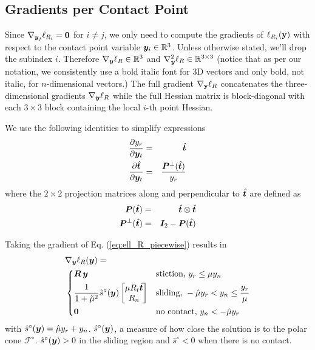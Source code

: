 \subsection{Gradients per Contact Point}
Since $\nabla_{{\bm{y}}_j}\ell_{R_i}={\bm{0}}$ for $i\neq j$, we only need to
compute the gradients of $\ell_{R_i}({\mathbf{y}})$ with respect to the contact point
variable ${\bm{y}}_i\in\mathbb{R}^3$. Unless otherwise stated, we'll drop the
subindex $i$. Therefore $\nabla_{\bm{y}}\ell_R\in\mathbb{R}^3$ and
$\nabla_{\bm{y}}^2\ell_R\in\mathbb{R}^{3\times 3}$ (notice that as per our
notation, we consistently use a bold italic font for 3D vectors and only bold,
not italic, for $n\text{-dimensional}$ vectors.) The full gradient
$\nabla_{\mathbf{y}}\ell_R$ concatenates the three-dimensional gradients
$\nabla_{\bm{y}}\ell_R$ while the full Hessian matrix is block-diagonal with each
$3\times 3$ block containing the local $i\text{-th}$ point Hessian.

We use the following identities to simplify expressions
\begin{eqnarray}
	\frac{\partial y_r}{\partial\vf{y}_t} &=& \hat{\vf{t}}\nonumber\\
	\frac{\partial \hat{\vf{t}}}{\partial\vf{y}_t} &=&
	\frac{\vf{P}^\perp(\hat{\vf{t}})}{y_r}
	\label{eq:yt_derivatives}
\end{eqnarray}
where the $2\times 2$ projection matrices along and perpendicular to
$\hat{{\bm{t}}}$ are defined as
\begin{eqnarray}
	\vf{P}(\hat{\vf{t}}) &=& \hat{\vf{t}}\otimes\hat{\vf{t}}\nonumber\\
	\vf{P}^\perp(\hat{\vf{t}})&=&\vf{I}_2 - \vf{P}(\hat{\vf{t}})
	\label{eq:tangential_projections}
\end{eqnarray}

Taking the gradient of Eq. (\ref{eq:ell_R_piecewise}) results in
\begin{align}
	&\nabla_\vf{y}\ell_R(\vf{y}) = 
	\label{eq:gradient_ell_R_piecewise}\\
&\begin{dcases}
	\vf{R}\,\vf{y} & 
	\text{stiction, } y_r \le \mu y_n\\
	\frac{1}{1+\tilde\mu^2}\hat{s}^\circ(\vf{y})\begin{bmatrix}
		\mu R_t\hat{\vf{t}}\\
		R_n\\
	\end{bmatrix} &
	\text{sliding, } -\hat\mu y_r < y_n \leq \frac{y_r}{\mu}\\
    \vf{0} & \text{no contact, } y_n < -\hat\mu y_r
\end{dcases}\nonumber
\end{align}
with $\hat{s}^\circ({\bm{y}}) = \hat{\mu}y_r+y_n$. $\hat{s}^\circ({\bm{y}})$, a
measure of how close the solution is to the polar cone $\mathcal{F}^\circ$.
$\hat{s}^\circ({\bm{y}}) > 0$ in the sliding region and $\hat{s}^\circ<0$ when
there is no contact. 

